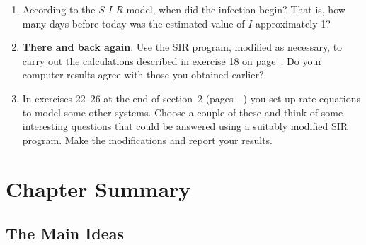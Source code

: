 \begin{enumerate}
  \begin{enumerate}
  \item Estimate the values of $S$, $I$, and $R$ {\em three\/} days
before today.



\end{enumerate}
\item According to the $S$-$I$-$R$ model, when did the infection begin?
That is, how many days before today was the estimated value of $I$
approximately 1?



\item {\bf There and back again}. Use the
SIR program, modified as necessary, to carry out the calculations
described in exercise 18 on page~\pageref{`therebackprob'}.  Do your
computer results agree with those you obtained earlier?


\item In exercises 22--26 at the end of section~2
(pages~\pageref{`falling'}--\pageref{`cooling'}) you set up rate
equations to model some other systems.  Choose a couple of these and
think of some interesting questions that could be answered using a
suitably modified SIR program.  Make the modifications and report your
results.


\end{enumerate}
\section{Chapter Summary}
\label{sec:chapter-summary}

\subsection{The Main Ideas}
\label{subsec:the-main-ideas}

